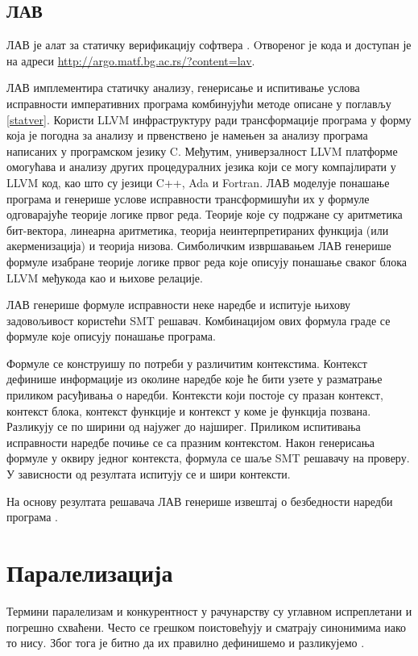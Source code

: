 \documentclass[12pt,oneside]{memoir}
\newtheorem{definic}{Дефиниција}
\begin{document}
  \section{ЛАВ}
	ЛАВ је алат за статичку верификацију софтвера \cite{mvjphd}. Oтвореног је кода и доступан је на адреси \url{http://argo.matf.bg.ac.rs/?content=lav}. 
	
	ЛАВ имплементира статичку анализу, генерисање и испитивање услова исправности императивних програма комбинујући методе описане у поглављу \ref{statver}. Користи LLVM инфраструктуру ради трансформације програма у форму која је погодна за анализу и првенствено је намењен за анализу програма написаних у програмском језику C. Међутим, универзалност LLVM платформе омогућава и анализу других процедуралних језика који се могу компајлирати у LLVM код, као што су језици C++, Ada и Fortran. ЛАВ моделује понашање програма и генерише услове исправности трансформишући их у формуле одговарајуће теорије логике првог реда. Теорије које су подржане су аритметика бит-вектора, линеарна аритметика, теорија неинтерпретираних функција (или акерменизација) и теорија низова.  Симболичким извршавањем ЛАВ генерише формуле изабране теорије логике првог реда које описују понашање сваког блока LLVM међукода као и њихове релације. 
	
	ЛАВ генерише формуле исправности неке наредбе и испитује њихову задовољивост користећи SMT решавач. Комбинацијом ових формула граде се формуле које описују понашање програма. 
	
	 Формуле се конструишу по потреби у различитим контекстима. Контекст дефинише информације из околине наредбе које ће бити узете у разматрање приликом расуђивања о наредби. Контексти који постоје су празан контекст, контекст блока, контекст функције и контекст у коме је функција позвана. Разликују се по ширини од најужег до најширег. Приликом испитивања исправности наредбе почиње се са празним контекстом.  Након генерисања формуле у оквиру једног контекста, формула се шаље SMT решавачу на проверу. У зависности од резултата испитују се и шири контексти. 
	 
 На основу резултата решавача ЛАВ генерише извештај о безбедности наредби програма \cite{mvjdev}. 	
	 
	
\chapter{Паралелизација}
	Термини паралелизам и конкурентност у рачунарству су углавном испреплетани и погрешно схваћени. Често се грешком поистовећују и сматрају синонимима иако то нису. Због тога је битно да их правилно дефинишемо и разликујемо \cite{par_computing}.
\end{document}

